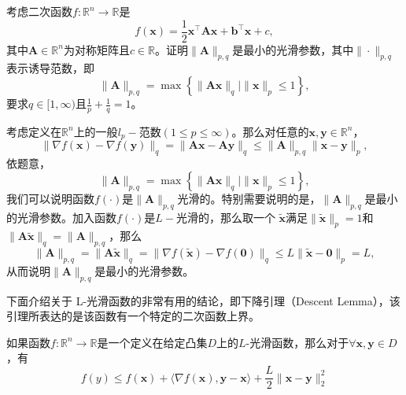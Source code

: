 \begin{problem}[二次函数的$L-$光滑]
    考虑二次函数$f: \mathbb{R}^{n} \rightarrow \mathbb{R}$是
    \begin{equation}
        f(\bm{x})=\frac{1}{2} \bm{x}^{\top} \bm{A} \bm{x}+\bm{b}^{\top} \bm{x}+c,
        \nonumber
    \end{equation}
其中$\bm{A} \in \mathbb{R}^{n}$为对称矩阵且$c \in \mathbb{R}$。证明$\|\bm{A}\|_{p, q}$是最小的光滑参数，其中$\|\cdot\|_{p, q}$表示诱导范数，即
    \begin{equation}
        \|\bm{A}\|_{p, q}=\max \left\{\|\bm{A} \bm{x}\|_{q} \mid\|\bm{x}\|_{p} \leq 1\right\},
        \nonumber
    \end{equation}
要求$q \in[1, \infty)$且$\frac{1}{p}+\frac{1}{q}=1$。
\end{problem}
\begin{solution}
    考虑定义在$\mathbb{R}^{n}$上的一般$l_{p} -$范数$(1 \leq p \leq \infty)$。那么对任意的$\bm{x}, \bm{y} \in \mathbb{R}^{n}$，
    \begin{equation}
        \|\nabla f(\bm{x})-\nabla f(\bm{y})\|_{q}=\|\bm{A} \bm{x}-\bm{A} \bm{y}\|_{q} \leq\|\bm{A}\|_{p, q}\|\bm{x}-\bm{y}\|_{p},
        \nonumber
    \end{equation}
    依题意，
    \begin{equation}
        \|\bm{A}\|_{p, q}=\max \left\{\|\bm{A} \bm{x}\|_{q} \mid\|\bm{x}\|_{p} \leq 1\right\},
        \nonumber
    \end{equation}
    我们可以说明函数$f(\cdot)$是$\|\bm{A}\|_{p, q}$光滑的。特别需要说明的是，$\|\bm{A}\|_{p, q}$是最小的光滑参数。加入函数$f(\cdot)$是$L -$光滑的，那么取一个 $\tilde{\bm{x}}$满足$\|\tilde{\bm{x}}\|_{p}=1$和$ \|\bm{A} \tilde{\bm{x}}\|_{q}=\|\bm{A}\|_{p, q}$，那么
    \begin{equation}
        \|\bm{A}\|_{p, q}=\|\bm{A} \tilde{\bm{x}}\|_{q}=\|\nabla f(\tilde{\bm{x}})-\nabla f(\mathbf{0})\|_{q} \leq L\|\tilde{\bm{x}}-\mathbf{0}\|_{p}=L,
        \nonumber
    \end{equation}
从而说明$\|\bm{A}\|_{p, q}$是最小的光滑参数。
\end{solution}
\par 下面介绍关于 L-光滑函数的非常有用的结论，即下降引理（Descent Lemma）\cite{2006NumericalOptmizationBook}，该引理所表达的是该函数有一个特定的二次函数上界。

\begin{theorem}[下降引理]
    如果函数$f: \mathbb{R}^{n}\rightarrow \mathbb{R}$是一个定义在给定凸集$D$上的$L$-光滑函数，那么对于$\forall \bm{x}, \bm{y}\in D$，有
    \begin{equation}
        f(y) \leq f(\bm{x}) + \langle \nabla f(\bm{x}), \bm{y}-\bm{x} \rangle + \frac{L}{2}\|\bm{x}-\bm{y}\|_{2}^{2}
    \end{equation}
    \label{thm435}
\end{theorem}

